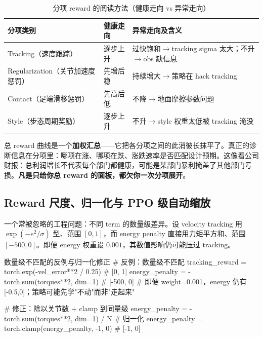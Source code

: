 \begin{table}[H]
\centering
\caption{分项 reward 的阅读方法（健康走向 vs 异常走向）}
\label{tab:rlmc-diag-rewterm}
\begin{tabular}{p{2.6cm}p{3.6cm}p{6.0cm}}
\hline
分项类别 & 健康走向 & 异常走向及含义 \\
\hline
Tracking（速度跟踪） & 逐步上升 & 过快饱和$\to$tracking sigma 太大；不升$\to$obs 缺信息 \\
Regularization（关节加速度惩罚） & 先增后稳 & 持续增大$\to$策略在 hack tracking \\
Contact（足端滑移惩罚） & 先高后低 & 不降$\to$地面摩擦参数问题 \\
Style（步态周期奖励） & 逐步上升 & 不升$\to$style 权重太低被 tracking 淹没 \\
\hline
\end{tabular}
\end{table}

\begin{insight}\label{ins:rlmc-diag-decompose}
总 reward 曲线是一个\textbf{加权汇总}——它把各分项之间的此消彼长抹平了。真正的诊断信息在分项里：哪项在涨、哪项在跌、涨跌速率是否匹配设计预期。这像看公司财报：总利润增长不代表每个部门都健康，可能是某部门暴利掩盖了其他部门亏损。\textbf{凡是只给你总 reward 的面板，都欠你一次分项展开}。
\end{insight}

\subsection{Reward 尺度、归一化与 PPO 级自动缩放}

一个常被忽略的工程问题：不同 term 的数量级差异。设 velocity tracking 用 $\exp(-e^2/\sigma)$ 型、范围 $[0,1]$，而 energy penalty 直接用力矩平方和、范围 $[-500,0]$。即便 energy 权重设 $0.001$，其数值影响仍可能压过 tracking。

\begin{codebox}[Python]{数量级不匹配的反例与归一化修正}
# 反例：数量级不匹配
tracking_reward = torch.exp(-vel_error**2 / 0.25)      # [0, 1]
energy_penalty  = -torch.sum(torques**2, dim=1)        # [-500, 0]
# 即便 weight=0.001，energy 仍有 [-0.5,0]；策略可能先学"不动"而非"走起来"

# 修正：除以关节数 + clamp 到同量级
energy_penalty  = -torch.sum(torques**2, dim=1) / N     # 归一化
energy_penalty  = torch.clamp(energy_penalty, -1, 0)    # [-1, 0]
\end{codebox}


